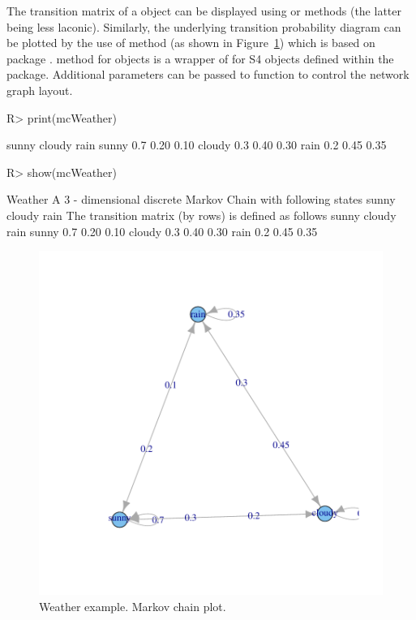 \documentclass[nojss]{jss}
\begin{document}
The transition matrix of a  object can be displayed using  or  
methods (the latter being less laconic). Similarly, the underlying transition probability diagram 
can be plotted by the use of  method (as shown in Figure~\ref{fig:mcPlot}) which is based on  package \citep{pkg:igraph}.
 method for  objects is a wrapper of
 for  S4 objects defined within the  package. 
Additional parameters can be passed to  function to control the network graph layout.

\begin{Schunk}
\begin{Sinput}
R> print(mcWeather)
\end{Sinput}
\begin{Soutput}
       sunny cloudy rain
sunny    0.7   0.20 0.10
cloudy   0.3   0.40 0.30
rain     0.2   0.45 0.35
\end{Soutput}
\begin{Sinput}
R> show(mcWeather)
\end{Sinput}
\begin{Soutput}
Weather 
 A  3 - dimensional discrete Markov Chain with following states 
 sunny cloudy rain 
 The transition matrix   (by rows)  is defined as follows 
       sunny cloudy rain
sunny    0.7   0.20 0.10
cloudy   0.3   0.40 0.30
rain     0.2   0.45 0.35
\end{Soutput}
\end{Schunk}

\begin{figure}
\begin{center}
\includegraphics{an_introduction_to_markovchain_package-mcPlot}
\caption{Weather example. Markov chain plot.}
\label{fig:mcPlot}
\end{center}
\end{figure}
\end{document}
